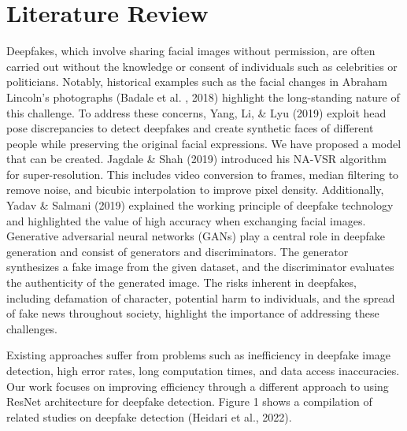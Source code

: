 \chapter{Literature Review}
Deepfakes, which involve sharing facial images without permission, are often carried out without the knowledge or consent of individuals such as celebrities or politicians.
 Notably, historical examples such as the facial changes in  Abraham Lincoln's photographs (Badale et al.
, 2018) highlight the long-standing nature of this challenge.
 To address these concerns, Yang, Li, \& Lyu (2019) exploit head pose discrepancies to detect deepfakes and create synthetic faces of different people while preserving the original facial expressions.
 We have proposed a model that can be created.
 Jagdale \& Shah (2019) introduced his NA-VSR algorithm for super-resolution.
 This includes video conversion to frames, median filtering to remove noise, and bicubic interpolation to improve pixel density.
 Additionally, Yadav \& Salmani (2019) explained the working principle of deepfake technology and highlighted the value of high accuracy when exchanging facial images.
 Generative adversarial neural networks (GANs) play a central role in deepfake generation and consist of generators and discriminators.
 The generator synthesizes a fake image from the given dataset, and the discriminator evaluates the authenticity of the generated image.
 The risks inherent in deepfakes, including defamation of character, potential harm to individuals, and the spread of fake news throughout society, highlight the importance of addressing these challenges.
 
 Existing approaches suffer from problems such as inefficiency in deepfake image detection, high error rates, long computation times, and data access inaccuracies.
 Our work focuses on improving efficiency through a different approach to using ResNet architecture for deepfake detection.
 Figure 1 shows a compilation of related studies on deepfake detection (Heidari et al., 2022).

